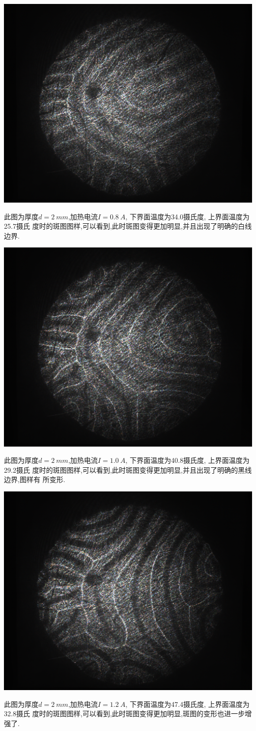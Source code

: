 \documentclass[aps,pre,12pt,preprint,onecolumn,showpacs,showkeys,floatfix]{revtex4-1}
\begin{document}
\begin{center}
    \includegraphics[width=.5\textwidth]{5.20/6.pdf}
\end{center}
    此图为厚度$d=\SI{2}{mm}$,加热电流$I=\SI{0.8}{A}$, 下界面温度为34.0摄氏度, 上界面温度为25.7摄氏
    度时的斑图图样,可以看到,此时斑图变得更加明显,并且出现了明确的白线边界.

\begin{center}
    \includegraphics[width=.5\textwidth]{5.20/7.pdf}
\end{center}
    此图为厚度$d=\SI{2}{mm}$,加热电流$I=\SI{1.0}{A}$, 下界面温度为40.8摄氏度, 上界面温度为29.2摄氏
    度时的斑图图样,可以看到,此时斑图变得更加明显,并且出现了明确的黑线边界,图样有
    所变形.

\begin{center}
    \includegraphics[width=.5\textwidth]{5.20/8.pdf}
\end{center}
    此图为厚度$d=\SI{2}{mm}$,加热电流$I=\SI{1.2}{A}$, 下界面温度为47.4摄氏度, 上界面温度为32.8摄氏
    度时的斑图图样,可以看到,此时斑图变得更加明显,斑图的变形也进一步增强了.
\end{document}
